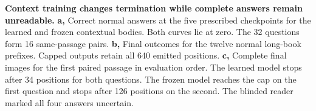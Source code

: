 \textbf{Context training changes termination while complete answers remain unreadable.}
\textbf{a,} Correct normal answers at the five prescribed checkpoints for the learned
and frozen contextual bodies. Both curves lie at zero. The 32 questions form 16
same-passage pairs. \textbf{b,} Final outcomes for the twelve normal long-book
prefixes. Capped outputs retain all 640 emitted positions.
\textbf{c,} Complete final images for the first paired passage in evaluation order.
The learned model stops after 34 positions for both questions. The frozen model
reaches the cap on the first question and stops after 126 positions on the second.
The blinded reader marked all four answers uncertain.
